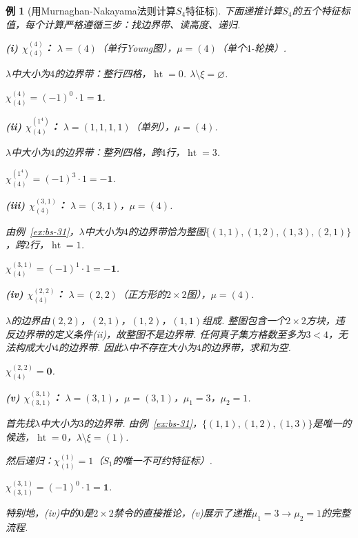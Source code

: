 \documentclass{sjtureport}
\newtheorem{example}{例}[chapter]
\begin{document}
\begin{example}[用Murnaghan-Nakayama法则计算$S_4$特征标]\label{ex:MN-S4}
下面递推计算$S_4$的五个特征标值，每个计算严格遵循三步：找边界带、读高度、递归. 

\medskip
\noindent\textbf{(i) $\chi^{(4)}_{(4)}$：}\quad
$\lambda=(4)$（单行Young图），$\mu=(4)$（单个$4$-轮换）. \par
$\lambda$中大小为$4$的边界带：整行四格，$\operatorname{ht}=0$. $\lambda\setminus\xi=\varnothing$. \par
$\chi^{(4)}_{(4)} = (-1)^0 \cdot 1 = \mathbf{1}$. 

\medskip
\noindent\textbf{(ii) $\chi^{(1^4)}_{(4)}$：}\quad
$\lambda=(1,1,1,1)$（单列），$\mu=(4)$. \par
$\lambda$中大小为$4$的边界带：整列四格，跨$4$行，$\operatorname{ht}=3$. \par
$\chi^{(1^4)}_{(4)} = (-1)^3 \cdot 1 = \mathbf{-1}$. 

\medskip
\noindent\textbf{(iii) $\chi^{(3,1)}_{(4)}$：}\quad
$\lambda=(3,1)$，$\mu=(4)$. \par
由例~\ref{ex:bs-31}，$\lambda$中大小为$4$的边界带恰为整图$\{(1,1),(1,2),(1,3),(2,1)\}$，跨$2$行，$\operatorname{ht}=1$. \par
$\chi^{(3,1)}_{(4)} = (-1)^1 \cdot 1 = \mathbf{-1}$. 

\medskip
\noindent\textbf{(iv) $\chi^{(2,2)}_{(4)}$：}\quad
$\lambda=(2,2)$（正方形的$2\times2$图），$\mu=(4)$. \par
$\lambda$的边界由$(2,2)$，$(2,1)$，$(1,2)$，$(1,1)$组成. 整图包含一个$2\times2$方块，违反边界带的定义条件(ii)，故整图\emph{不是}边界带. 任何真子集方格数至多为$3<4$，无法构成大小$4$的边界带. 因此$\lambda$中不存在大小为$4$的边界带，求和为空. \par
$\chi^{(2,2)}_{(4)} = \mathbf{0}$. 

\medskip
\noindent\textbf{(v) $\chi^{(3,1)}_{(3,1)}$：}\quad
$\lambda=(3,1)$，$\mu=(3,1)$，$\mu_1=3$，$\mu_2=1$. \par
首先找$\lambda$中大小为$3$的边界带. 由例~\ref{ex:bs-31}，$\{(1,1),(1,2),(1,3)\}$是唯一的候选，$\operatorname{ht}=0$，$\lambda\setminus\xi=(1)$. \par
然后递归：$\chi^{(1)}_{(1)}=1$（$S_1$的唯一不可约特征标）. \par
$\chi^{(3,1)}_{(3,1)} = (-1)^0 \cdot 1 = \mathbf{1}$. 



特别地，(iv)中的$0$是$2\times2$禁令的直接推论，(v)展示了递推$\mu_1=3\to\mu_2=1$的完整流程. 
\end{example}
\end{document}

